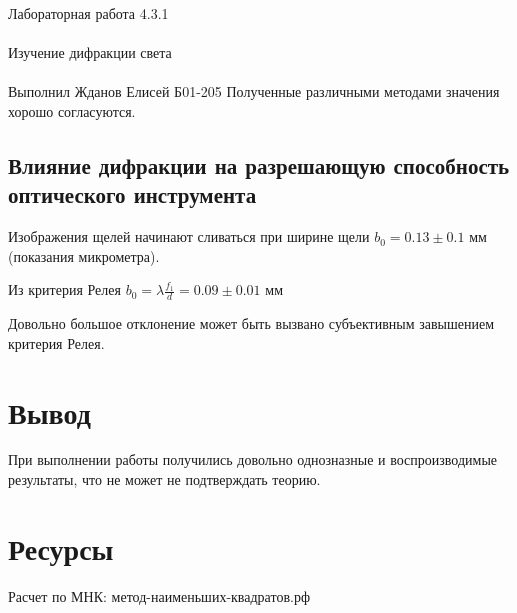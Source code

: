 \documentclass{astroedu-lab}
\begin{document}
\begin{problem}{\huge Лабораторная работа 4.3.1\\\\Изучение дифракции света\\\\Выполнил Жданов Елисей Б01-205}
Полученные различными методами значения хорошо согласуются.

\subsection{Влияние дифракции на разрешающую способность оптического инструмента}

Изображения щелей начинают сливаться при ширине щели $b_0 = 0.13 \pm 0.1$ мм (показания микрометра).

Из критерия Релея $b_0 = \lambda \frac{f_1}{d} = 0.09 \pm 0.01$ мм

Довольно большое отклонение может быть вызвано субъективным завышением критерия Релея.

\section{Вывод}

При выполнении работы получились довольно однозназные и воспроизводимые результаты, что не может не подтверждать теорию.

\section{Ресурсы}

Расчет по МНК: метод-наименьших-квадратов.рф


\end{problem}
\end{document}
